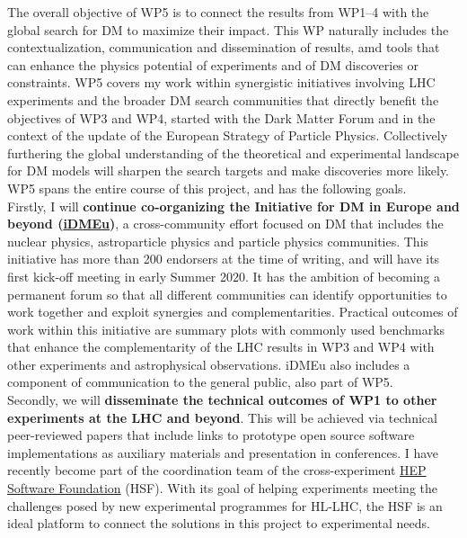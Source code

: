 The overall objective of WP5 is to connect the results from WP1--4 with the global search for DM to maximize their impact. 
This WP naturally includes the contextualization, communication and dissemination of results, amd tools that can enhance the physics potential of experiments and of DM discoveries or constraints. WP5 covers my work within synergistic initiatives involving LHC experiments and the broader DM search communities that directly benefit the objectives of WP3 and WP4, started with the Dark Matter Forum and in the context of the update of the European Strategy of Particle Physics. Collectively furthering the global understanding of the theoretical and experimental landscape for DM models will sharpen the search targets and make discoveries more likely. WP5 spans the entire course of this project, and has the following goals. 
\\
Firstly, I will \textbf{continue co-organizing the Initiative for DM in Europe and beyond (\href{https://indico.cern.ch/e/iDMEu/}{iDMEu})}, a cross-community effort focused on DM that includes the nuclear physics, astroparticle physics and particle physics communities. 
This initiative has more than 200 endorsers at the time of writing, and will have its first kick-off meeting in early Summer 2020. 
It has the ambition of becoming a permanent forum so that all different communities can identify opportunities to work together and exploit synergies and complementarities. 
Practical outcomes of work within this initiative are summary plots with commonly used benchmarks that enhance the complementarity of the LHC results in WP3 and WP4 with other experiments and astrophysical observations. iDMEu also includes a component of communication to the general public, also part of WP5. 
\\
Secondly, we will \textbf{disseminate the technical outcomes of WP1 to other experiments at the LHC and beyond}. 
This will be achieved via technical peer-reviewed papers that include links to prototype open source software implementations as auxiliary materials and presentation in conferences. 
I have recently become part of the coordination team of the cross-experiment \href{https://hepsoftwarefoundation.org}{HEP Software Foundation} (HSF). 
With its goal of helping experiments meeting the challenges posed by new experimental programmes for HL-LHC, the HSF is an ideal platform to connect the solutions in this project to experimental needs. 
\\
